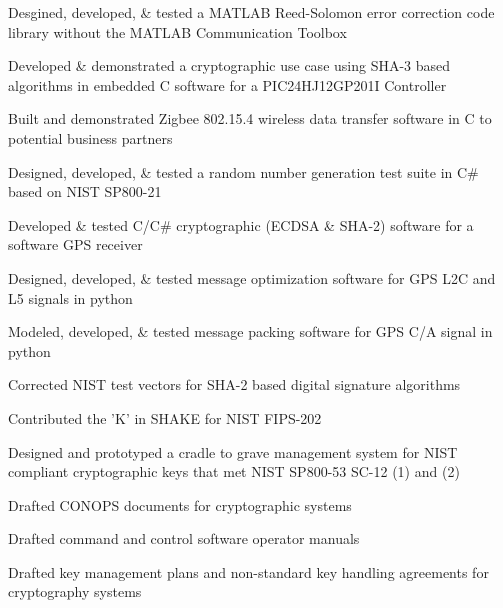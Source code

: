 \documentclass[letterpaper]{clinton-resume}
\begin{document}
\begin{minipage}[t]{0.66\textwidth}
\begin{tightitemize}
\item Desgined, developed, \& tested a MATLAB Reed-Solomon error correction code library without the MATLAB Communication Toolbox
\item Developed \& demonstrated a cryptographic use case using SHA-3 based algorithms in embedded C software for a PIC24HJ12GP201I Controller
\item Built and demonstrated Zigbee 802.15.4 wireless data transfer software in C to potential business partners
\item Designed, developed, \& tested a random number generation test suite in C\# based on NIST SP800-21
\item Developed \& tested C/C\# cryptographic (ECDSA \& SHA-2) software for a software GPS receiver 
\item Designed, developed, \& tested message optimization software for GPS L2C and L5 signals in python
\item Modeled, developed, \& tested message packing software for GPS C/A signal in python
\item Corrected NIST test vectors for SHA-2 based digital signature algorithms
\item Contributed the 'K' in SHAKE for NIST FIPS-202
\item Designed and prototyped a cradle to grave management system for NIST compliant cryptographic keys that met NIST SP800-53 SC-12 (1) and (2)
\item Drafted CONOPS documents for cryptographic systems
\item Drafted command and control software operator manuals
\item Drafted key management plans and non-standard key handling agreements for cryptography systems
\end{tightitemize}
\sectionspace %
\end{minipage}
\newpage%
\end{document}
